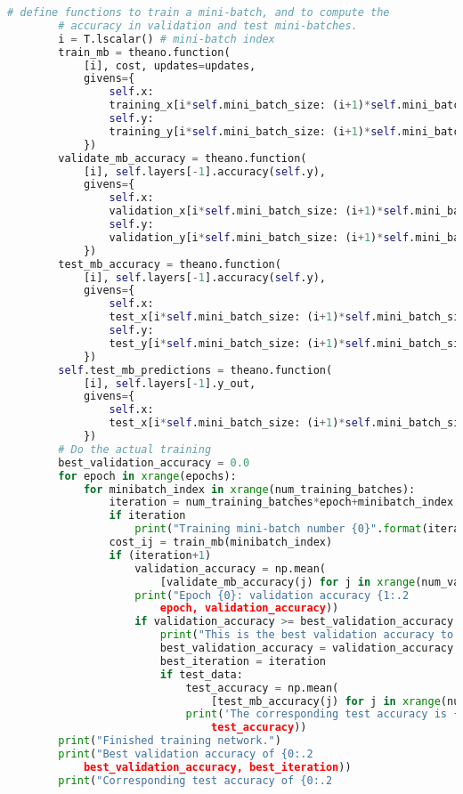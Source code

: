 \begin{lstlisting}[language=Python]
        # define functions to train a mini-batch, and to compute the
        # accuracy in validation and test mini-batches.
        i = T.lscalar() # mini-batch index
        train_mb = theano.function(
            [i], cost, updates=updates,
            givens={
                self.x:
                training_x[i*self.mini_batch_size: (i+1)*self.mini_batch_size],
                self.y: 
                training_y[i*self.mini_batch_size: (i+1)*self.mini_batch_size]
            })
        validate_mb_accuracy = theano.function(
            [i], self.layers[-1].accuracy(self.y),
            givens={
                self.x: 
                validation_x[i*self.mini_batch_size: (i+1)*self.mini_batch_size],
                self.y: 
                validation_y[i*self.mini_batch_size: (i+1)*self.mini_batch_size]
            })
        test_mb_accuracy = theano.function(
            [i], self.layers[-1].accuracy(self.y),
            givens={
                self.x: 
                test_x[i*self.mini_batch_size: (i+1)*self.mini_batch_size],
                self.y: 
                test_y[i*self.mini_batch_size: (i+1)*self.mini_batch_size]
            })
        self.test_mb_predictions = theano.function(
            [i], self.layers[-1].y_out,
            givens={
                self.x: 
                test_x[i*self.mini_batch_size: (i+1)*self.mini_batch_size]
            })
        # Do the actual training
        best_validation_accuracy = 0.0
        for epoch in xrange(epochs):
            for minibatch_index in xrange(num_training_batches):
                iteration = num_training_batches*epoch+minibatch_index
                if iteration 
                    print("Training mini-batch number {0}".format(iteration))
                cost_ij = train_mb(minibatch_index)
                if (iteration+1) 
                    validation_accuracy = np.mean(
                        [validate_mb_accuracy(j) for j in xrange(num_validation_batches)])
                    print("Epoch {0}: validation accuracy {1:.2
                        epoch, validation_accuracy))
                    if validation_accuracy >= best_validation_accuracy:
                        print("This is the best validation accuracy to date.")
                        best_validation_accuracy = validation_accuracy
                        best_iteration = iteration
                        if test_data:
                            test_accuracy = np.mean(
                                [test_mb_accuracy(j) for j in xrange(num_test_batches)])
                            print('The corresponding test accuracy is {0:.2
                                test_accuracy))
        print("Finished training network.")
        print("Best validation accuracy of {0:.2
            best_validation_accuracy, best_iteration))
        print("Corresponding test accuracy of {0:.2
\end{lstlisting}

